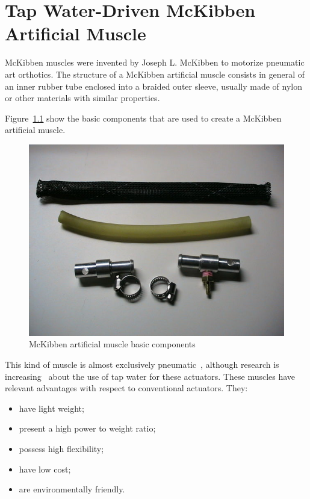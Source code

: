 
\chapter{Tap Water-Driven McKibben Artificial Muscle}
\label{ch:muscle}

McKibben muscles were invented by Joseph L. McKibben to motorize pneumatic art orthotics.
The structure of a McKibben artificial muscle consists
in general of an inner rubber tube enclosed into a braided outer sleeve,
usually made of nylon or other materials with similar properties.

Figure~\ref{fig:components} show the basic components that are used to
create a McKibben artificial muscle.

\begin{figure}[H]
	\centering
	\includegraphics[width=.75\textwidth]{Images/muscle_components}
	\caption{McKibben artificial muscle basic components}
	\label{fig:components}
\end{figure}

This kind of muscle is almost exclusively pneumatic~\cite{chou1994static},
although research is increasing~\cite{kobayashi2017analysis} about the use of tap water for these actuators.
These muscles have relevant advantages with respect to conventional actuators. They:

\begin{itemize}
	\item have light weight;
	\item present a high power to weight ratio;
	\item possess high flexibility;
	\item have low cost;
	\item are environmentally friendly.
\end{itemize}

